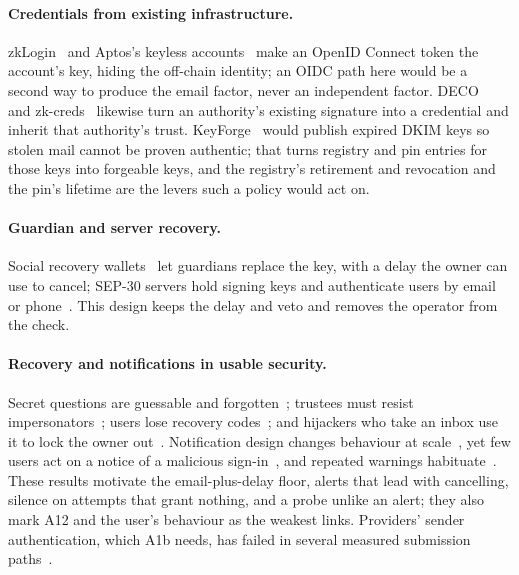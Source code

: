 \paragraph{Credentials from existing infrastructure.} zkLogin~\cite{zklogin}
and Aptos's keyless accounts~\cite{aptos-aip61} make an OpenID Connect token
the account's key, hiding the off-chain identity; an OIDC path here would be
a second way to produce the email factor, never an independent factor.
DECO~\cite{deco} and zk-creds~\cite{zkcreds} likewise turn an authority's
existing signature into a credential and inherit that authority's trust.
KeyForge~\cite{specter-keyforge} would publish expired DKIM keys so stolen
mail cannot be proven authentic; that turns registry and pin entries for
those keys into forgeable keys, and the registry's retirement and revocation
and the pin's lifetime are the levers such a policy would act on.

\paragraph{Guardian and server recovery.} Social recovery
wallets~\cite{buterin-social-recovery,argent-spec} let guardians replace the
key, with a delay the owner can use to cancel; SEP-30 servers hold signing
keys and authenticate users by email or phone~\cite{sep30}. This design keeps
the delay and veto and removes the operator from the check.

\paragraph{Recovery and notifications in usable security.} Secret questions
are guessable and forgotten~\cite{schechter-secret-questions,bonneau-recovery};
trustees must resist impersonators~\cite{schechter-social-recovery}; users
lose recovery codes~\cite{holtervennhoff-recovery-codes}; and hijackers who
take an inbox use it to lock the owner out~\cite{bursztein-hijacking}. Notification design changes behaviour at
scale~\cite{golla-2fa-notifications}, yet few users act on a notice of a
malicious sign-in~\cite{markert-login-notifications}, and repeated warnings
habituate~\cite{anderson-habituation}. These results motivate the
email-plus-delay floor, alerts that lead with cancelling, silence on
attempts that grant nothing, and a probe unlike an alert; they also mark A12
and the user's behaviour as the weakest links. Providers' sender
authentication, which A1b needs, has failed in several measured submission
paths~\cite{chen-composition-kills,shen-weak-links}.
